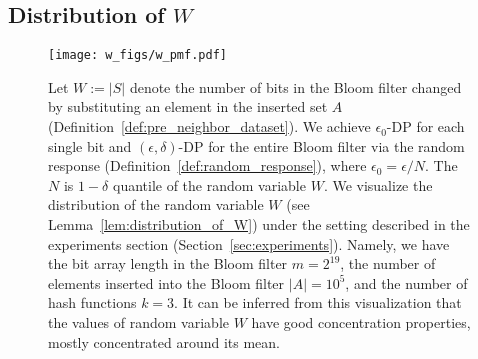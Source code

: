 \subsection{Distribution of \texorpdfstring{$W$}{}}\label{sec:distribution_W}


\begin{figure}[!ht]
\centering
\texttt{[image: w\_figs/w\_pmf.pdf]}
\caption{
Let $W := |S|$ denote the number of bits in the Bloom filter changed by substituting an element in the inserted set $A$ (Definition~\ref{def:pre_neighbor_dataset}). We achieve $\epsilon_0$-DP for each single bit and $(\epsilon, \delta)$-DP for the entire Bloom filter via the random response (Definition~\ref{def:random_response}), where $\epsilon_0 = \epsilon / N$. 
The $N$ is $1 - \delta$ quantile of the random variable $W$. 
We visualize the distribution of the random variable $W$ (see Lemma~\ref{lem:distribution_of_W}) under the setting described in the experiments section (Section~\ref{sec:experiments}). Namely, we have the bit array length in the Bloom filter $m = 2^{19}$, the number of elements inserted into the Bloom filter $|A| = 10^{5}$, and the number of hash functions $k=3$. It can be inferred from this visualization that the values of random variable $W$ have good concentration properties, mostly concentrated around its mean. 
}
\label{fig:w_distribution}
\end{figure}

